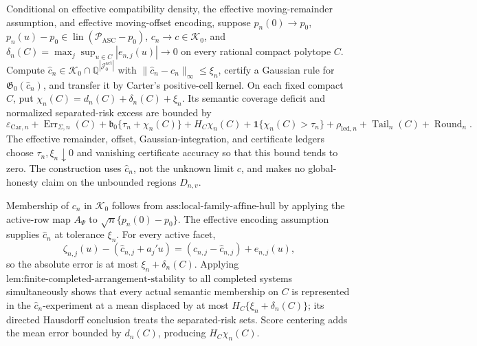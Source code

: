 Conditional on effective compatibility density, the effective moving-remainder assumption, and effective moving-offset encoding, suppose \(p_n(0)\to p_0\), \(p_n(u)-p_0\in\operatorname{lin}(\mathcal P_{\mathrm{ASC}}-p_0)\), \(c_n\to c\in\mathcal K_0\), and \(\delta_n(C)=\max_j\sup_{u\in C}|e_{n,j}(u)|\to0\) on every rational compact polytope \(C\). Compute \(\widehat c_n\in\mathcal K_0\cap\mathbb Q^{|\mathcal J_0^{\mathrm{act}}|}\) with \(\|\widehat c_n-c_n\|_\infty\le\xi_n\), certify a Gaussian rule for \(\mathfrak G_0(\widehat c_n)\), and transfer it by Carter's positive-cell kernel. On each fixed compact \(C\), put \(\chi_n(C)=d_n(C)+\delta_n(C)+\xi_n\). Its semantic coverage deficit and normalized separated-risk excess are bounded by
\[
 \varepsilon_{\mathrm{Car},n}+\operatorname{Err}_{\Sigma,n}(C)
 +\mathfrak b_0\{\tau_n+\chi_n(C)\}
 +H_C\chi_n(C)+\mathbf1\{\chi_n(C)>\tau_n\}
 +\rho_{\mathrm{led},n}+\operatorname{Tail}_n(C)+\operatorname{Round}_n.
\]
The effective remainder, offset, Gaussian-integration, and certificate ledgers choose \(\tau_n,\xi_n\downarrow0\) and vanishing certificate accuracy so that this bound tends to zero. The construction uses \(\widehat c_n\), not the unknown limit \(c\), and makes no global-honesty claim on the unbounded regions \(D_{n,v}\).

Membership of \(c_n\) in \(\mathcal K_0\) follows from \(\text{ass:local-family-affine-hull}\) by applying the active-row map \(A_\Psi\) to \(\sqrt n\{p_n(0)-p_0\}\). The effective encoding assumption supplies \(\widehat c_n\) at tolerance \(\xi_n\). For every active facet,
\[
 \zeta_{n,j}(u)-(\widehat c_{n,j}+a_j'u)
 =(c_{n,j}-\widehat c_{n,j})+e_{n,j}(u),
\]
so the absolute error is at most \(\xi_n+\delta_n(C)\). Applying \(\text{lem:finite-completed-arrangement-stability}\) to all completed systems simultaneously shows that every actual semantic membership on \(C\) is represented in the \(\widehat c_n\)-experiment at a mean displaced by at most \(H_C\{\xi_n+\delta_n(C)\}\); its directed Hausdorff conclusion treats the separated-risk sets. Score centering adds the mean error bounded by \(d_n(C)\), producing \(H_C\chi_n(C)\).

